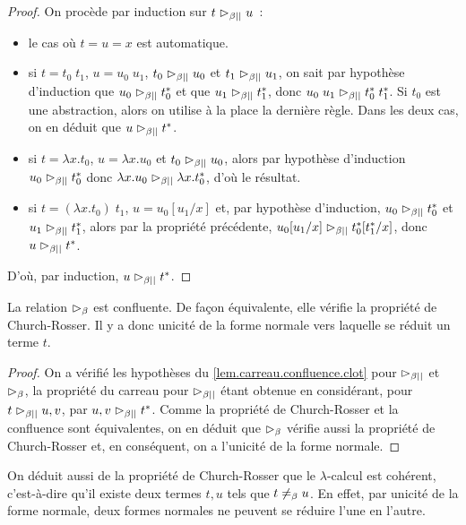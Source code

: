 \begin{proof}
  On procède par induction sur $t\mathrel{\rhd_{\mathord{\beta}\mathord{||}}} u$~:
  \begin{itemize}
  \item le cas où $t = u = x$ est automatique.
  \item si $t = t_0\;t_1$, $u = u_0\;u_1$, $t_0 \mathrel{\rhd_{\mathord{\beta}\mathord{||}}} u_0$ et
    $t_1\mathrel{\rhd_{\mathord{\beta}\mathord{||}}} u_1$, on sait par hypothèse d'induction que
    $u_0\mathrel{\rhd_{\mathord{\beta}\mathord{||}}} t_0^*$ et que $u_1\mathrel{\rhd_{\mathord{\beta}\mathord{||}}} t_1^*$, donc
    $u_0\;u_1\mathrel{\rhd_{\mathord{\beta}\mathord{||}}} t_0^*\;t_1^*$. Si $t_0$ est une abstraction, alors
    on utilise à la place la dernière règle. Dans les deux cas, on
    en déduit que $u\mathrel{\rhd_{\mathord{\beta}\mathord{||}}} t^*$.
  \item si $t = \lambda x.t_0$, $u = \lambda x.u_0$ et $t_0\mathrel{\rhd_{\mathord{\beta}\mathord{||}}} u_0$, alors
    par hypothèse d'induction $u_0\mathrel{\rhd_{\mathord{\beta}\mathord{||}}} t_0^*$ donc
    $\lambda x.u_0\mathrel{\rhd_{\mathord{\beta}\mathord{||}}} \lambda x.t^*_0$, d'où le résultat.
  \item si $t = (\lambda x.t_0)\;t_1$, $u = u_0[u_1/x]$ et, par hypothèse
    d'induction, $u_0\mathrel{\rhd_{\mathord{\beta}\mathord{||}}} t_0^*$ et $u_1\mathrel{\rhd_{\mathord{\beta}\mathord{||}}} t_1^*$, alors
    par la propriété précédente, $u_0[u_1/x]\mathrel{\rhd_{\mathord{\beta}\mathord{||}}} t_0^*[t_1^*/x]$, donc
    $u\mathrel{\rhd_{\mathord{\beta}\mathord{||}}} t^*$.
  \end{itemize}
  D'où, par induction, $u\mathrel{\rhd_{\mathord{\beta}\mathord{||}}} t^*$.
\end{proof}

\begin{corollary}
  La relation $\mathrel{\rhd_{\beta}}$ est confluente. De façon équivalente, elle vérifie la
  propriété de Church-Rosser. Il y a donc unicité de la forme normale vers
  laquelle se réduit un terme $t$.
\end{corollary}

\begin{proof}
  On a vérifié les hypothèses du \cref{lem.carreau.confluence.clot} pour
  $\mathrel{\rhd_{\mathord{\beta}\mathord{||}}}$ et $\mathrel{\rhd_{\beta}}$, la propriété du carreau pour $\mathrel{\rhd_{\mathord{\beta}\mathord{||}}}$ étant obtenue
  en considérant, pour $t \mathrel{\rhd_{\mathord{\beta}\mathord{||}}} u,v$, par $u,v\mathrel{\rhd_{\mathord{\beta}\mathord{||}}} t^*$. Comme la
  propriété de Church-Rosser et la confluence sont équivalentes, on en déduit
  que $\mathrel{\rhd_{\beta}}$ vérifie aussi la propriété de Church-Rosser et, en conséquent,
  on a l'unicité de la forme normale.
\end{proof}

\begin{remark}
  On déduit aussi de la propriété de Church-Rosser que le $\lambda$-calcul est
  cohérent, c'est-à-dire qu'il existe deux termes $t,u$ tels que
  $t \not=_{\beta} u$. En effet, par unicité de la forme normale, deux formes
  normales ne peuvent se réduire l'une en l'autre.
\end{remark}

